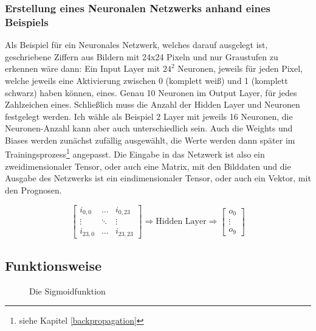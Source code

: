 \subsubsection{Erstellung eines Neuronalen Netzwerks anhand eines Beispiels}

Als Beispiel für ein Neuronales Netzwerk, welches darauf ausgelegt ist, geschriebene Ziffern aus Bildern mit 24x24 Pixeln und nur Graustufen zu erkennen wäre dann: Ein Input Layer mit $24^2$ Neuronen, jeweils für jeden Pixel, welche jeweils eine Aktivierung zwischen 0 (komplett weiß) und 1 (komplett schwarz) haben können, eines. Genau 10 Neuronen im Output Layer, für jedes Zahlzeichen eines. Schließlich muss die Anzahl der Hidden Layer und Neuronen festgelegt werden. Ich wähle als Beispiel 2 Layer mit jeweils 16 Neuronen, die Neuronen-Anzahl kann aber auch unterschiedlich sein. Auch die Weights und Biases werden zunächst zufällig ausgewählt, die Werte werden dann später im Trainingsprozess\footnote{siehe Kapitel \ref{backpropagation}} angepasst. Die Eingabe in das Netzwerk ist also ein zweidimensionaler Tensor, oder auch eine Matrix, mit den Bilddaten und die Ausgabe des Netzwerks ist ein eindimensionaler Tensor, oder auch ein Vektor, mit den Prognosen.

\begin{equation}
    \begin{bmatrix}
        i_{0,0}  & \ldots & i_{0,23}  \\
        \vdots   & \ddots & \vdots    \\
        i_{23,0} & \ldots & i_{23,23}
    \end{bmatrix}
    \Longrightarrow
    \text{Hidden Layer}
    \Longrightarrow
    \begin{bmatrix}
        o_0    \\
        \vdots \\
        o_9
    \end{bmatrix}
\end{equation}

\subsection{Funktionsweise} \label{funktionsweise}

\setlength{\belowcaptionskip}{-10pt}
\begin{figure}
    \resizebox{6cm}{!}{}
    \caption[Sigmoid]{Die Sigmoidfunktion}
    \label{sigmoid}
\end{figure}
\setlength{\belowcaptionskip}{0pt}

